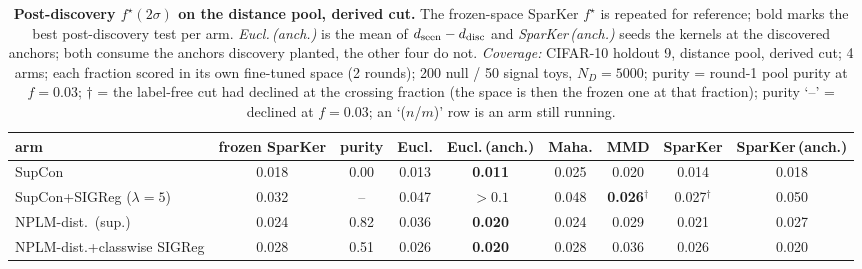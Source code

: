 \begin{table}[t]
\centering
\footnotesize
\begin{tabular}{lcccccccc}
\toprule
arm & frozen SparKer & purity & Eucl. & Eucl.\,(anch.) & Maha. & MMD & SparKer & SparKer\,(anch.) \\
\midrule
SupCon & 0.018 & 0.00 & 0.013 & \textbf{0.011} & 0.025 & 0.020 & 0.014 & 0.018 \\
\addlinespace
SupCon+SIGReg ($\lambda{=}5$) & 0.032 & -- & 0.047 & $>0.1$ & 0.048 & \textbf{0.026$^\dagger$} & 0.027$^\dagger$ & 0.050 \\
\addlinespace
NPLM-dist.\ (sup.) & 0.024 & 0.82 & 0.036 & \textbf{0.020} & 0.024 & 0.029 & 0.021 & 0.027 \\
\addlinespace
NPLM-dist.+classwise SIGReg & 0.028 & 0.51 & 0.026 & \textbf{0.020} & 0.028 & 0.036 & 0.026 & 0.020 \\
\bottomrule
\end{tabular}
\caption{\textbf{Post-discovery $f^\star(2\sigma)$ on the distance pool, derived cut.} The frozen-space SparKer $f^\star$ is repeated for reference; bold marks the best post-discovery test per arm. \emph{Eucl.\,(anch.)} is the mean of $d_{\rm seen}-d_{\rm disc}$ and \emph{SparKer\,(anch.)} seeds the kernels at the discovered anchors; both consume the anchors discovery planted, the other four do not. \emph{Coverage:} CIFAR-10 holdout 9, distance pool, derived cut; 4 arms; each fraction scored in its own fine-tuned space (2 rounds); 200 null / 50 signal toys, $N_D{=}5000$; purity = round-1 pool purity at $f{=}0.03$; $\dagger$ = the label-free cut had declined at the crossing fraction (the space is then the frozen one at that fraction); purity `--' = declined at $f{=}0.03$; an `($n$/$m$)' row is an arm still running.}
\label{tab:sigma_post_cifar10_h9_legal}
\end{table}
